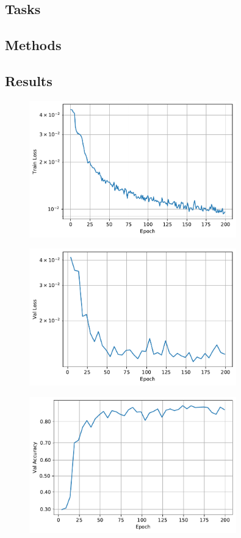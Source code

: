 \documentclass{article}
\begin{document}
\subsection{Tasks}

\subsection{Methods}

\subsection{Results}

\begin{figure}
    \centering
    \includegraphics[width=0.8\textwidth]{fig_train_loss}
\end{figure}

\begin{figure}
    \centering
    \includegraphics[width=0.8\textwidth]{fig_val_loss}
\end{figure}

\begin{figure}
    \centering
    \includegraphics[width=0.8\textwidth]{fig_accuracy}
\end{figure}
\end{document}
